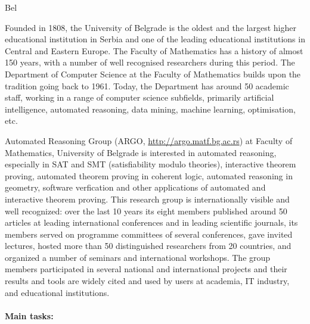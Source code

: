 \begin{sitedescription}{Bel}

  

  Founded in 1808, the University of Belgrade is the oldest and the
  largest higher educational institution in Serbia and one of the
  leading educational institutions in Central and Eastern Europe. The
  Faculty of Mathematics has a history of almost 150 years, with a
  number of well recognised researchers during this period. The
  Department of Computer Science at the Faculty of Mathematics builds
  upon the tradition going back to 1961. Today, the Department has
  around 50 academic staff, working in a range of computer science
  subfields, primarily artificial intelligence, automated reasoning,
  data mining, machine learning, optimisation, etc.
  
  Automated Reasoning Group (ARGO, \url{http://argo.matf.bg.ac.rs}) at
  Faculty of Mathematics, University of Belgrade is interested in
  automated reasoning, especially in SAT and SMT (satisfiability
  modulo theories), interactive theorem proving, automated theorem
  proving in coherent logic, automated reasoning in geometry, software
  verfication and other applications of automated and interactive
  theorem proving. This research group is internationally visible and
  well recognized: over the last 10 years its eight members published
  around 50 articles at leading international conferences and in
  leading scientific journals, its members served on programme
  committees of several conferences, gave invited lectures, hosted
  more than 50 distinguished researchers from 20 countries, and
  organized a number of seminars and international workshops. The
  group members participated in several national and international
  projects and their results and tools are widely cited and used by
  users at academia, IT industry, and educational institutions.

  \paragraph{Main tasks:}

  

\end{sitedescription}
